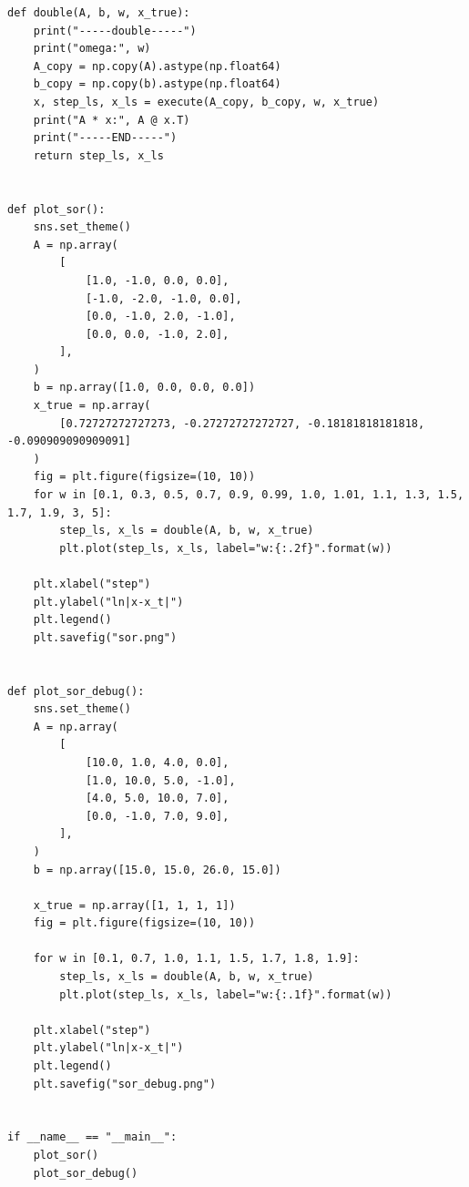 \documentclass{jsarticle}
\begin{document}
\begin{lstlisting}[caption=SOR法,label=参照ラベル]
def double(A, b, w, x_true):
    print("-----double-----")
    print("omega:", w)
    A_copy = np.copy(A).astype(np.float64)
    b_copy = np.copy(b).astype(np.float64)
    x, step_ls, x_ls = execute(A_copy, b_copy, w, x_true)
    print("A * x:", A @ x.T)
    print("-----END-----")
    return step_ls, x_ls


def plot_sor():
    sns.set_theme()
    A = np.array(
        [
            [1.0, -1.0, 0.0, 0.0],
            [-1.0, -2.0, -1.0, 0.0],
            [0.0, -1.0, 2.0, -1.0],
            [0.0, 0.0, -1.0, 2.0],
        ],
    )
    b = np.array([1.0, 0.0, 0.0, 0.0])
    x_true = np.array(
        [0.72727272727273, -0.27272727272727, -0.18181818181818, -0.090909090909091]
    )
    fig = plt.figure(figsize=(10, 10))
    for w in [0.1, 0.3, 0.5, 0.7, 0.9, 0.99, 1.0, 1.01, 1.1, 1.3, 1.5, 1.7, 1.9, 3, 5]:
        step_ls, x_ls = double(A, b, w, x_true)
        plt.plot(step_ls, x_ls, label="w:{:.2f}".format(w))

    plt.xlabel("step")
    plt.ylabel("ln|x-x_t|")
    plt.legend()
    plt.savefig("sor.png")


def plot_sor_debug():
    sns.set_theme()
    A = np.array(
        [
            [10.0, 1.0, 4.0, 0.0],
            [1.0, 10.0, 5.0, -1.0],
            [4.0, 5.0, 10.0, 7.0],
            [0.0, -1.0, 7.0, 9.0],
        ],
    )
    b = np.array([15.0, 15.0, 26.0, 15.0])

    x_true = np.array([1, 1, 1, 1])
    fig = plt.figure(figsize=(10, 10))

    for w in [0.1, 0.7, 1.0, 1.1, 1.5, 1.7, 1.8, 1.9]:
        step_ls, x_ls = double(A, b, w, x_true)
        plt.plot(step_ls, x_ls, label="w:{:.1f}".format(w))

    plt.xlabel("step")
    plt.ylabel("ln|x-x_t|")
    plt.legend()
    plt.savefig("sor_debug.png")


if __name__ == "__main__":
    plot_sor()
    plot_sor_debug()
\end{lstlisting}


\end{document}
